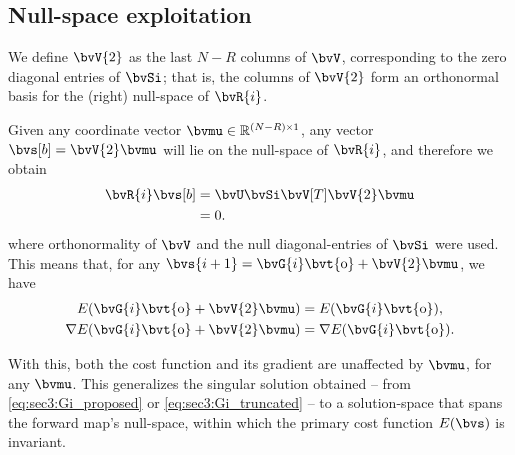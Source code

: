 \subsection{Null-space exploitation}

We define $\bvV{2}$ as the last $N-R$ columns of $\bvV$, corresponding to the zero diagonal entries of $\bvSi$; that is, the columns of $\bvV{2}$ form an orthonormal basis for the (right) null-space of $\bvR{i}$.

Given any coordinate vector $\bvmu \in \re^{\sz{(N-R)}{1}}$, any vector $\bvs[b] = \bvV{2} \bvmu$ will lie on the null-space of $\bvR{i}$, and therefore we obtain
\begin{equation}
	\begin{split}
		\bvR{i} \bvs[b] 
		& = \bvU \bvSi \bvV[T] \bvV{2} \bvmu \\
		& = 0.
	\end{split}
\end{equation}
where orthonormality of $\bvV$ and the null diagonal-entries of $\bvSi$ were used. This means that, for any $\bvs{i+1} = \bvG{i} \bvt{\obs} + \bvV{2} \bvmu$, we have
\begin{subequations}
	\label{eqs:sec3:cost-gradient_null-space}
	\begin{gather}
		E(\bvG{i} \bvt{\obs} + \bvV{2} \bvmu) = E(\bvG{i} \bvt{\obs}), \\
		\nabla E(\bvG{i} \bvt{\obs} + \bvV{2} \bvmu) = \nabla E(\bvG{i} \bvt{\obs}).
	\end{gather}
\end{subequations}

With this, both the cost function and its gradient are unaffected by $\bvmu$, for any $\bvmu$. This generalizes the singular solution obtained -- from \cref{eq:sec3:Gi_proposed} or \cref{eq:sec3:Gi_truncated} -- to a solution-space that spans the forward map's null-space, within which the primary cost function $E(\bvs)$ is invariant.

